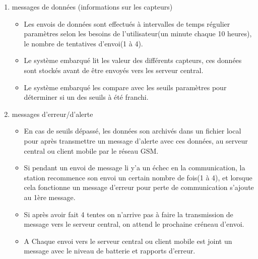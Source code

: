 \begin{description}
\begin{enumerate}
	\item messages de données (informations sur les capteurs)\\
		\begin{itemize}
		\item Les envois de données sont effectués à intervalles de temps régulier paramètres selon les besoins de l'utilisateur(un minute chaque 10 heures), le nombre de tentatives d'envoi(1 à 4).\\
		\item Le système embarqué lit les valeur des différents capteurs, ces données sont stockés avant de être envoyés vers les serveur central.\\
		\item Le système embarqué les compare avec les seuils paramètres pour déterminer si un des seuils à été franchi. \\
		\end{itemize}

	\item messages d'erreur/d'alerte\\
		\begin{itemize}
		\item En cas de seuils dépassé, les données son archivés dans un fichier local pour après  transmettre un message d'alerte avec ces données, au serveur central ou client mobile par le réseau GSM. \\
		\item Si pendant un envoi de message li y'a un échec en la communication, la station recommence son envoi un certain nombre de fois(1 à 4), et lorsque cela fonctionne un message d'erreur pour perte de communication s'ajoute au 1ère message.\\
		\item Si après avoir fait 4 tentes on n'arrive pas à faire la transmission de message vers le serveur central, on attend le prochaine créneau d'envoi.\\
		\item A Chaque envoi vers le serveur central ou client mobile est joint un message avec le niveau de batterie et rapports d'erreur.\\
		\end{itemize}\hfill\\
	\end{enumerate}


\end{description}

